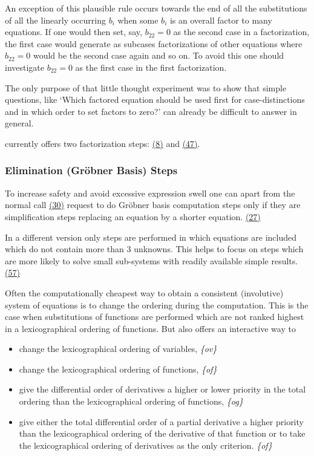 An exception of this plausible rule occurs towards the end of all the
substitutions of all the linearly occurring $b_i$ when some $b_i$ is
an overall factor to many equations.  If one would then set, say,
$b_{22}=0$ as the second case in a factorization, the first case would
generate as subcases factorizations of other equations where
$b_{22}=0$ would be the second case again and so on.  To avoid this
one should investigate $b_{22}=0$ as the first case in the first
factorization.

The only purpose of that little thought experiment was to show that
simple questions, like `Which factored equation should be used first
for case-distinctions and in which order to set factors to zero?' can
already be difficult to answer in general.

 currently offers two factorization steps:
\hyperlink{crack-m_8}{(8)} and \hyperlink{crack-m_47}{(47)}.

\subsubsection{Elimination (Gr\"{o}bner Basis) Steps}

To increase safety and avoid excessive expression swell one can apart
from the normal call \hyperlink{crack-m_30}{(30)} request to do
Gr\"{o}bner basis computation steps only if they are simplification
steps replacing an equation by a shorter equation.
\hyperlink{crack-m_27}{(27)}

In a different version only steps are performed in which equations are
included which do not contain more than 3 unknowns.  This helps to
focus on steps which are more likely to solve small sub-systems with
readily available simple results.  \hyperlink{crack-m_57}{(57)}

Often the computationally cheapest way to obtain a consistent
(involutive) system of equations is to change the ordering during the
computation.  This is the case when substitutions of functions are
performed which are not ranked highest in a lexicographical ordering
of functions.  But  also offers an interactive way to
\begin{itemize}
\item change the lexicographical ordering of variables, \emph{\{ov\}}
\item change the lexicographical ordering of functions, \emph{\{of\}}
\item give the differential order of derivatives a higher or lower
  priority in the total ordering than the lexicographical ordering of
  functions, \emph{\{og\}}
\item give either the total differential order of a partial derivative
  a higher priority than the lexicographical ordering of the
  derivative of that function or to take the lexicographical ordering
  of derivatives as the only criterion.  \emph{\{of\}}
\end{itemize}

